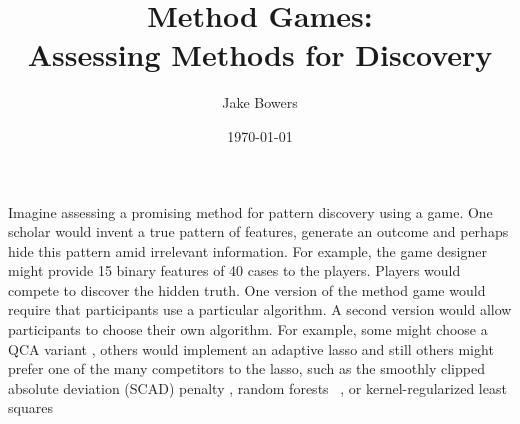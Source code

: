 \documentclass[12pt]{article}
\title{Method Games:\\ Assessing Methods for Discovery}
\author{Jake Bowers}
\date{\today}
\begin{document}
\maketitle

Imagine assessing a promising method for pattern discovery using a game.  One
scholar would invent a true pattern of features, generate an outcome and
perhaps hide this pattern amid irrelevant information.  For example, the game
designer might provide 15 binary features of 40 cases to the players. Players
would compete to discover the hidden truth.  One version of the method game
would require that participants use a particular algorithm. A second version
would allow participants to choose their own algorithm. For example, some
might choose a QCA variant \citep{rihoux2008configurational}, others would
implement an adaptive lasso \citep{zou2006adaptive} and still others might
prefer one of the many competitors to the lasso, such as the smoothly clipped
absolute deviation (SCAD) penalty \citep{fan2001variable}, random forests
~\citep{breiman2001random}, or kernel-regularized least squares
\end{document}
